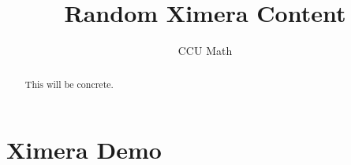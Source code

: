 \documentclass{xourse}
\title{Random Ximera Content}
\author{CCU Math}
\begin{document}
\begin{abstract}
    This will be concrete.
\end{abstract}
\maketitle

\part{Ximera Demo}

\end{document}
